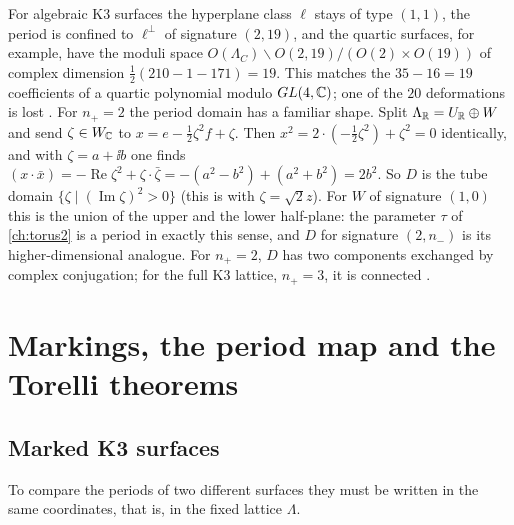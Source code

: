 \begin{remark}[The case $n_+=2$: upper half-planes]\label{rem:k3lattice:tube}
For algebraic K3 surfaces the hyperplane class $\ell$ stays of type $(1,1)$, the period is
confined to $\ell^\perp$ of signature $(2,19)$, and the quartic surfaces, for example, have
the moduli space $O(\Lambda_C)\backslash O(2,19)/(O(2)\times O(19))$ of complex dimension
$\tfrac12(210-1-171)=19$. This matches the $35-16=19$ coefficients of a quartic polynomial
modulo $GL(4,\mathbb{C})$; one of the $20$ deformations is lost
. For $n_+=2$ the period domain has a familiar
shape. Split $\Lambda_{\mathbb{R}}=U_{\mathbb{R}}\oplus W$ and send $\zeta\in W_{\mathbb{C}}$ to
$x=e-\tfrac12\zeta^2f+\zeta$. Then $x^2=2\cdot(-\tfrac12\zeta^2)+\zeta^2=0$ identically, and
with $\zeta=a+\ii b$ one finds $(x\cdot\bar x)=-\operatorname{Re}\zeta^2+\zeta\cdot\bar\zeta
=-(a^2-b^2)+(a^2+b^2)=2b^2$. So $D$ is the tube domain $\{\zeta\mid(\operatorname{Im}
\zeta)^2>0\}$ (this is  with $\zeta=\sqrt2z$).
For $W$ of signature $(1,0)$ this is the union of the upper and the lower half-plane: the
parameter $\tau$ of \cref{ch:torus2} is a period in exactly this sense, and $D$ for
signature $(2,n_-)$ is its higher-dimensional analogue. For $n_+=2$, $D$ has two
components exchanged by complex conjugation; for the full K3 lattice, $n_+=3$, it is
connected .
\end{remark}

\section{Markings, the period map and the Torelli theorems}\label{sec:k3lattice:torelli}

\subsection{Marked K3 surfaces}
To compare the periods of two different surfaces they must be written in the same
coordinates, that is, in the fixed lattice $\Lambda$.

